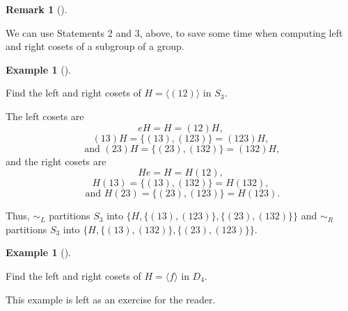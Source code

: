 \documentclass[10pt,]{book}
\theoremstyle{plain}
\theoremstyle{definition}
\theoremstyle{definition}
\newtheorem{remark}[theorem]{Remark}
\theoremstyle{definition}
\newtheorem{example}[theorem]{Example}
\theoremstyle{definition}
\numberwithin{equation}{section}
\def\siml{\sim_L}
\def\simr{\sim_R}
\begin{document}
\begin{remark}[]\label{remark-39}

      We can use Statements 2 and 3, above, to save some
      time when computing left and right cosets of a subgroup of a
      group.
\end{remark}
\begin{example}[]\label{s3_ex}

        Find the left and right cosets of \(H=\langle (12)\rangle\) in
        \(S_3\).
\par
The left cosets are %
\begin{equation*}
eH=H=(12)H,
\end{equation*}
%
\begin{equation*}
(13)H=\{(13),(123)\}=(123)H,
\end{equation*}
%
\begin{equation*}
\text{ and } (23)H=\{(23),(132)\}=(132)H,
\end{equation*}
 and the 
      right cosets are %
\begin{equation*}
He=H=H(12),
\end{equation*}
%
\begin{equation*}
 H(13)=\{(13),(132)\}=H(132),
\end{equation*}
%
\begin{equation*}
\text{ and } H(23)=\{(23),(123)\}=H(123).
\end{equation*}
%
\par

        Thus, \(\siml\) partitions \(S_3\) into \(\{H,\{(13),(123)\},\{(23),
        (132)\}\}\) and \(\simr\) partitions \(S_3\) into
        \(\{H,\{(13),(132)\},\{(23), (123)\}\}\).
\end{example}
\begin{example}[]\label{d4_ex}

        Find the left and right cosets of \(H=\langle f\rangle\) in
        \(D_4\).
\par

        This example is left as an exercise for the reader.
\end{example}
\par
\end{document}
